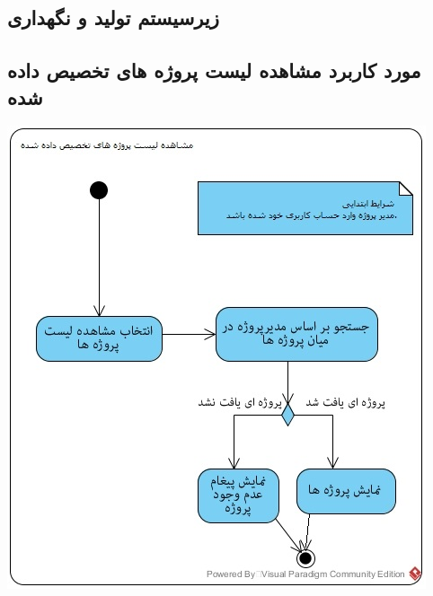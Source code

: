 \newpage
\subsection{زیرسیستم تولید و نگهداری}

\vspace{2cm}
\subsection*{مورد کاربرد مشاهده لیست پروژه های تخصیص داده شده}
\vspace{2cm}
\begin{center}
\includegraphics[width=\textwidth]{ActivityDiagrams/16.jpg}
\end{center}


\newpage
\vspace{2cm}
